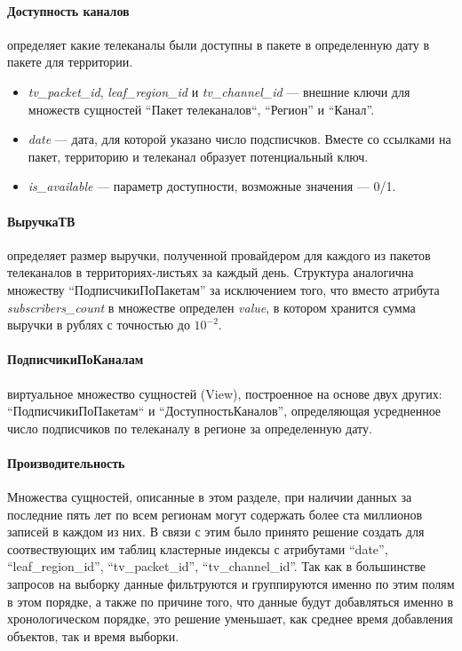 \paragraph{Доступность каналов} определяет какие телеканалы были доступны в пакете в определенную дату в пакете для территории.
\begin{itemize}
\item{
  \textit{tv\_packet\_id}, \textit{leaf\_region\_id} и \textit{tv\_channel\_id} --- внешние ключи для множеств сущностей 
``Пакет телеканалов``, ``Регион'' и ``Канал''.
}
\item{
  \textit{date} --- дата, для которой указано число подсписчков. Вместе со ссылками на пакет, территорию и телеканал
образует потенциальный ключ.
}
\item{
  \textit{is\_available} --- параметр доступности, возможные значения --- 0/1. 
}
\end{itemize}

\paragraph{ВыручкаТВ} определяет размер выручки, полученной провайдером для каждого из пакетов телеканалов в территориях-листьях 
за каждый день. Структура аналогична множеству ``ПодписчикиПоПакетам'' за исключением того, что вместо атрибута 
\textit{subscribers\_count} в множестве определен \textit{value}, в котором хранится сумма выручки в рублях с точностью до $10^{-2}$.

\paragraph{ПодписчикиПоКаналам} виртуальное множество сущностей (View), построенное на основе двух других:
``ПодписчикиПоПакетам`` и ``ДоступностьКаналов'', определяющая усредненное число подписчиков по телеканалу в регионе
за определенную дату.

\paragraph{Производительность} Множества сущностей, описанные в этом разделе, при наличии данных за последние пять лет по всем регионам
могут содержать более ста миллионов записей в каждом из них.
В связи с этим было принято решение создать для соотвествующих им таблиц кластерные индексы
с атрибутами ``date'', ``leaf\_region\_id'', ``tv\_packet\_id'', ``tv\_channel\_id''.
Так как в большинстве запросов на выборку данные фильтруются и группируются именно по этим полям
в этом порядке, а также по причине того, что данные будут добавляться именно в хронологическом порядке,
это решение уменьшает, как среднее время добавления объектов, так и время выборки.


